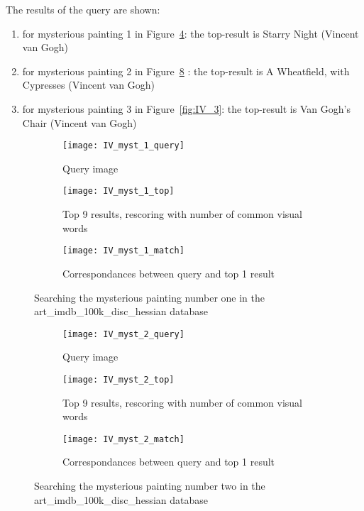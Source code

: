 \documentclass{article}
\begin{document}
The results of the query are shown:
\begin{enumerate}
	\item for mysterious painting 1 in Figure~\ref{fig:IV_1}: the top-result is Starry Night (Vincent van Gogh)
	\item for mysterious painting 2 in Figure~\ref{fig:IV_2} : the top-result is A Wheatfield, with Cypresses (Vincent van Gogh)
	\item for mysterious painting 3 in Figure~\ref{fig:IV_3}: the top-result is Van Gogh's Chair (Vincent van Gogh)
\end{enumerate}

\begin{figure}[ht!]
	\begin{subfigure}[b]{0.9\textwidth}
		\centering
		\texttt{[image: IV\_myst\_1\_query]}
		\caption{Query image}
		\label{fig:IV_11}
	\end{subfigure}

	\begin{subfigure}[b]{0.9\textwidth}
		\centering
		\texttt{[image: IV\_myst\_1\_top]}
		\caption{Top 9 results, rescoring with number of common visual words}
		\label{fig:IV_12}
	\end{subfigure}

	\begin{subfigure}[b]{0.9\textwidth}
		\centering
		\texttt{[image: IV\_myst\_1\_match]}
		\caption{Correspondances between query and top 1 result}
		\label{fig:IV_13}
	\end{subfigure}

	\caption{Searching the mysterious painting number one in the art\_imdb\_100k\_disc\_hessian database}
	\label{fig:IV_1}
\end{figure}


\begin{figure}[ht!]
	\begin{subfigure}[b]{0.9\textwidth}
		\centering
		\texttt{[image: IV\_myst\_2\_query]}
		\caption{Query image}
		\label{fig:IV_21}
	\end{subfigure}

	\begin{subfigure}[b]{0.9\textwidth}
		\centering
		\texttt{[image: IV\_myst\_2\_top]}
		\caption{Top 9 results, rescoring with number of common visual words}
		\label{fig:IV_22}
	\end{subfigure}

	\begin{subfigure}[b]{0.9\textwidth}
		\centering
		\texttt{[image: IV\_myst\_2\_match]}
		\caption{Correspondances between query and top 1 result}
		\label{fig:IV_23}
	\end{subfigure}

	\caption{Searching the mysterious painting number two in the art\_imdb\_100k\_disc\_hessian database}
	\label{fig:IV_2}
\end{figure}
\end{document}
